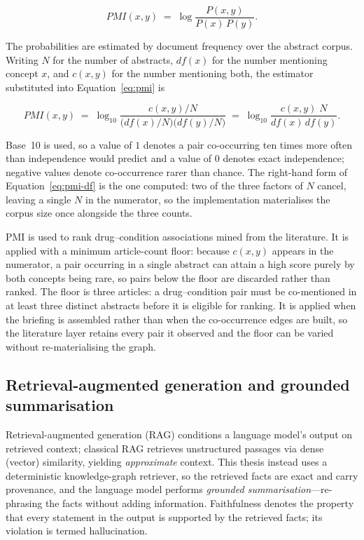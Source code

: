 \begin{equation}
\mathit{PMI}(x, y) \;=\; \log \frac{P(x, y)}{P(x)\,P(y)} .
\label{eq:pmi}
\end{equation}

The probabilities are estimated by document frequency over the abstract corpus. Writing $N$
for the number of abstracts, $\mathit{df}(x)$ for the number mentioning concept $x$, and
$c(x,y)$ for the number mentioning both, the estimator substituted into
Equation~\ref{eq:pmi} is

\begin{equation}
\mathit{PMI}(x, y)
\;=\; \log_{10} \frac{c(x,y)/N}{\bigl(\mathit{df}(x)/N\bigr)\bigl(\mathit{df}(y)/N\bigr)}
\;=\; \log_{10} \frac{c(x,y)\;N}{\mathit{df}(x)\,\mathit{df}(y)} .
\label{eq:pmi-df}
\end{equation}

Base~10 is used, so a value of $1$ denotes a pair co-occurring ten times more often than
independence would predict and a value of $0$ denotes exact independence; negative values
denote co-occurrence rarer than chance. The right-hand form of Equation~\ref{eq:pmi-df} is
the one computed: two of the three factors of $N$ cancel, leaving a single $N$ in the
numerator, so the implementation materialises the corpus size once alongside the three
counts.

PMI is used to rank drug--condition associations mined from the literature. It is applied
with a minimum article-count floor: because $c(x,y)$ appears in the numerator, a pair
occurring in a single abstract can attain a high score purely by both concepts being rare,
so pairs below the floor are discarded rather than ranked. The floor is three articles: a
drug--condition pair must be co-mentioned in at least three distinct abstracts before it is
eligible for ranking. It is applied when the briefing is assembled rather than when the
co-occurrence edges are built, so the literature layer retains every pair it observed and
the floor can be varied without re-materialising the graph.

\subsection{Retrieval-augmented generation and grounded summarisation}
Retrieval-augmented generation (RAG) \cite{rag_lewis2020} conditions a language model's output
on retrieved context; classical RAG retrieves unstructured passages via dense (vector)
similarity, yielding \emph{approximate} context. This thesis instead uses a deterministic
knowledge-graph retriever, so the retrieved facts are exact and carry provenance, and the
language model performs \emph{grounded summarisation}---re-phrasing the facts without adding
information. Faithfulness denotes the property that every statement in the output is supported
by the retrieved facts; its violation is termed hallucination.

